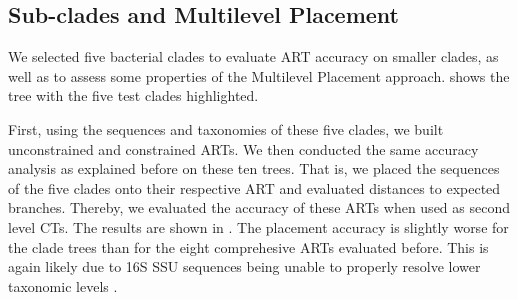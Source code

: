 
\subsection{Sub-clades and Multilevel Placement}
\label{sec:Results:sub:MultilevelPlacement}

We selected five bacterial clades to evaluate \ac{ART} accuracy on smaller clades,
as well as to assess some properties of the Multilevel Placement approach.
 shows the  tree with the five test clades highlighted.

First, using the sequences and taxonomies of these five clades, we built unconstrained and constrained \acp{ART}.
We then conducted the same accuracy analysis as explained before on these ten trees.
That is, we placed the  sequences of the five clades onto their respective \ac{ART}
and evaluated distances to expected branches.
Thereby, we evaluated the accuracy of these \acp{ART} when used as second level \aclp{CT}.
The results are shown in .
The placement accuracy is slightly worse for the clade trees than for the eight comprehesive \acp{ART} evaluated before.
This is again likely due to 16S SSU sequences being unable to properly resolve lower taxonomic levels \citep{Janda2007}.

